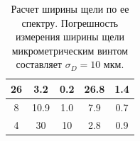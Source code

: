 \begin{table}
\begin{tabular}{|c|c|c|c|c|}
26                                                                         & 3.2                                                                                                                       & 0.2                                                                                               & 26.8                                                                                         & 1.4                                                                                         \\ \hline
8                                                                          & 10.9                                                                                                                      & 1.0                                                                                               & 7.9                                                                                          & 0.7                                                                                         \\ \hline
4                                                                          & 30                                                                                                                        & 10                                                                                                & 2.8                                                                                          & 0.9                                                                                         \\ \hline
\end{tabular}
\caption{Расчет ширины щели по ее спектру. Погрешность измерения ширины щели микрометрическим винтом составляет $\sigma_D = 10$ мкм.}
\label{tab:A2}
\end{table}
